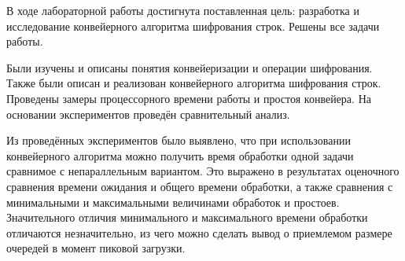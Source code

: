 В ходе лабораторной работы достигнута поставленная цель: разработка и исследование конвейерного алгоритма шифрования строк. Решены все задачи работы.

Были изучены и описаны понятия конвейеризации и операции шифрования. Также были описан и реализован конвейерного алгоритма шифрования строк. Проведены замеры процессорного времени работы и простоя конвейера. На основании экспериментов проведён сравнительный анализ.

Из проведённых экспериментов было выявлено, что при использовании конвейерного алгоритма можно получить время обработки одной задачи сравнимое с непараллельным вариантом. Это выражено в результатах оценочного сравнения времени ожидания и общего времени обработки, а также сравнения с минимальными и максимальными величинами обработок и простоев. Значительного отличия минимального и максимального времени обработки отличаются незначительно, из чего можно сделать вывод о приемлемом размере очередей в момент пиковой загрузки.